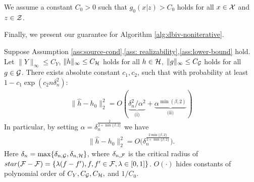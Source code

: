 \vspace{-2mm}
\begin{assumption}\label{ass:lower-bound}
    We assume a constant $C_0>0$ such that $g_0(x|z) > C_0$ holds for all $x \in \mathcal{X}$ and $z\in\mathcal{Z}$. 
\end{assumption}
\vspace{-2mm}

Finally, we present our guarantee for Algorithm \ref{alg:dbiv-noniterative}. 

\vspace{-2mm}
\begin{theorem}\label{thm: mle-nonmisspec-noniter}
    Suppose Assumption \ref{ass:source-cond},\ref{ass: realizability},\ref{ass:lower-bound} hold. Let $\|Y\|_\infty\leq C_Y$, $\|h\|_\infty \leq C_{\mathcal{H}}$ holds for all $h\in\mathcal{H}$, $\|g\|_\infty \leq C_{\mathcal{G}}$ holds for all $g\in\mathcal{G}$. 
    There exists absolute constant $c_1, c_2$, such that with probability at least $1- c_1\exp(c_2n\delta_n^2)$: 
    \begin{align*}\textstyle 
           \| \hat{h} - h_0 \|_2^2 =   O(\underbrace{\delta^2_n/\alpha^2}_{\text{(i)}}  +  \underbrace{\alpha^{\min(\beta,2) }}_{\text{(ii)}}   ) 
    \end{align*}
  In particular, by setting $\alpha = \delta_n^{\frac{2}{2+\min\{\beta, 2\}}}$
    we have 
    \begin{align}\label{eq:final}\textstyle 
    \| \hat{h} - h_0 \|_2^2 =  O\big(\delta_n^{\frac{2\min\{\beta, 2\}}{2 + \min\{\beta, 2\}}}\big).       
    \end{align}
    Here $\delta_{n} = \max\{\delta_{n, \mathcal{G}},\delta_{n, \mathcal{H}} \}$, where $\delta_{n, \mathcal{F}}$ is the critical radius of $star(\mathcal{F} - \mathcal{F}) = \{\lambda (f - f'), f,f'\in\mathcal{F}, \lambda \in [0,1]\}$. $O(\cdot)$ hides constants of polynomial order of $C_Y, C_{\mathcal{G}}, C_{\mathcal{H}}, $ and $1/C_0$.
\end{theorem}


